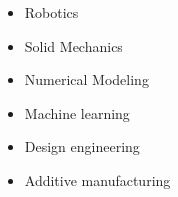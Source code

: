 \documentclass[
	a4paper,
]{ThirtyNinesecondscv}
\begin{document}
\begin{multicols}{2}
\begin{itemize}
\item Robotics
 \item Solid Mechanics
\item Numerical Modeling
 \item Machine learning
 \item Design engineering 
 \item Additive manufacturing
\end{itemize}
\end{multicols}

\end{document}
